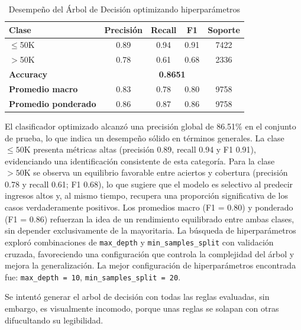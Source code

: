 \documentclass[12pt,a4paper]{article}
\begin{document}
\begin{enumerate}
\begin{itemize}
      \begin{table}[H]
        \centering
        \small
          \begin{tabular}{lcccc}
          \toprule
          \textbf{Clase} & \textbf{Precisión} & \textbf{Recall} & \textbf{F1} & \textbf{Soporte} \\
          \midrule
          $\leq$50K & 0.89 & 0.94 & 0.91 & 7422 \\
          $>$50K    & 0.78 & 0.61 & 0.68 & 2336 \\
          \midrule
          \textbf{Accuracy} & \multicolumn{4}{c}{\textbf{0.8651}} \\
          \midrule
          \textbf{Promedio macro}     & 0.83 & 0.78 & 0.80 & 9758 \\
          \textbf{Promedio ponderado} & 0.86 & 0.87 & 0.86 & 9758 \\
          \bottomrule
          \end{tabular}
        \caption{Desempeño del Árbol de Decisión optimizando hiperparámetros}
        \label{tab:dt_gridsearch_test}
      \end{table}

      El clasificador optimizado alcanzó una precisión global de 86.51\% en el conjunto de prueba, 
      lo que indica un desempeño sólido en términos generales. La clase \(\leq 50\text{K}\) presenta métricas altas (precisión 0.89, recall 0.94 y F1 0.91), 
      evidenciando una identificación consistente de esta categoría. Para la clase \(>50\text{K}\) se observa un equilibrio 
      favorable entre aciertos y cobertura (precisión 0.78 y recall 0.61; F1 0.68), lo que sugiere que el modelo es selectivo al predecir ingresos altos y, 
      al mismo tiempo, recupera una proporción significativa de los casos verdaderamente positivos. Los promedios macro (F1 = 0.80) y ponderado (F1 = 0.86) 
      refuerzan la idea de un rendimiento equilibrado entre ambas clases, sin depender exclusivamente de la mayoritaria. La búsqueda de hiperparámetros exploró 
      combinaciones de \texttt{max\_depth} y \texttt{min\_samples\_split} con validación cruzada, favoreciendo una configuración que controla la complejidad del árbol 
      y mejora la generalización. La mejor configuración de hiperparámetros encontrada fue: \texttt{max\_depth = 10}, \texttt{min\_samples\_split = 20}.

      Se intentó generar el arbol de decisión con todas las reglas evaluadas, sin embargo, es visualmente incomodo, porque unas reglas se solapan con otras 
      difucultando su legibilidad.
    \end{itemize}


\end{enumerate}
\end{document}
